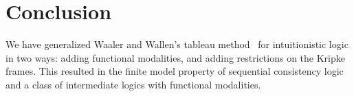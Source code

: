  \section{Conclusion}

 We have generalized Waaler and Wallen's tableau method~\cite{waaler1999tableaux} for intuitionistic
 logic in two ways: adding functional modalities, and adding restrictions on the Kripke frames.
 This resulted in the finite model property of sequential consistency
 logic~\cite{hirailpar} and a class of intermediate logics with
 functional modalities.

